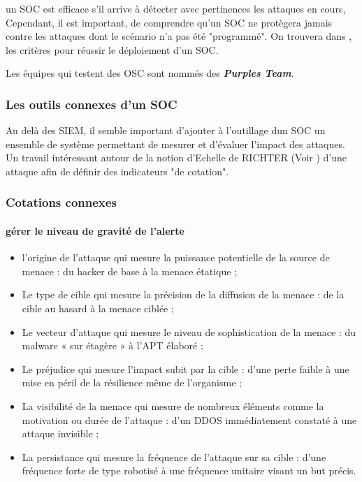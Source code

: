 
un SOC est efficace s’il arrive à détecter avec pertinences les attaques en cours,  Cependant, il est important, de comprendre qu’un SOC ne protègera jamais contre les attaques dont le scénario n'a pas été "programmé". On trouvera dans , les critères pour réussir le déploiement d'un SOC.

Les équipes qui testent des OSC sont nommés des \textbf{\textit{Purples Team}}.

\subsubsection{Les outils connexes d'un SOC}

Au delà des SIEM, il semble important d'ajouter à l'outillage dun SOC un ensemble de système permettant de mesurer et d'évaluer l'impact des attaques. Un travail intéressant autour de la notion d'Echelle de RICHTER (Voir  ) d'une attaque afin de définir des indicateurs "de cotation".

\begin{frame}
\frametitle<presentation>{Cotations connexes	}
\framesubtitle<presentation>{gérer le niveau de gravité de l'alerte}
\begin{itemize}
  \item l’origine de l’attaque qui mesure la puissance potentielle de la source de menace : du hacker de base à la menace étatique ;
  \item Le type de cible qui mesure la précision de la diffusion de la menace : de la cible au hasard à la menace ciblée ;
  \item Le vecteur d’attaque qui mesure le niveau de sophistication de la menace : du malware « sur étagère » à l’APT élaboré ;
   \item Le préjudice qui mesure l’impact subit par la cible : d’une perte faible à une mise en péril de la résilience même de l’organisme ;
  \item La visibilité de la menace qui mesure de nombreux éléments comme la motivation ou durée de l’attaque : d’un DDOS immédiatement constaté à une attaque invisible ;
  \item La persistance qui mesure la fréquence de l’attaque sur sa cible : d’une fréquence forte de type robotisé à une fréquence unitaire visant un but précis.
\end{itemize}
\end{frame}


